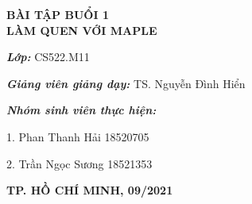 \begin{titlepage}
\begin{center}
		\textbf{BÀI TẬP BUỔI 1}\\
		\textbf{LÀM QUEN VỚI MAPLE}
		
	\end{center}
			
		\vspace{1.25cm}
		\normalsize	
		
		\hspace{70pt} \textbf{\textit{Lớp:}} CS522.M11
		
		\vspace*{0.1cm}
		
		\hspace{70pt} \textbf{\textit{Giảng viên giảng dạy:}} TS. Nguyễn Đình Hiển
			
		\vspace*{0.1cm}
			
		\hspace{70pt} \textbf{\textit{Nhóm sinh viên thực hiện:}}
		
		\hspace{70pt} 1. \hspace{10pt} Phan Thanh Hải \hspace{98pt} 18520705
		
		\hspace{70pt} 2. \hspace{10pt} Trần Ngọc Sương \hspace{95pt} 18521353
			
		\vspace{2.5cm}
		
	\begin{center}
		\textbf{TP. HỒ CHÍ MINH, 09/2021}
    \end{center}

\end{titlepage}